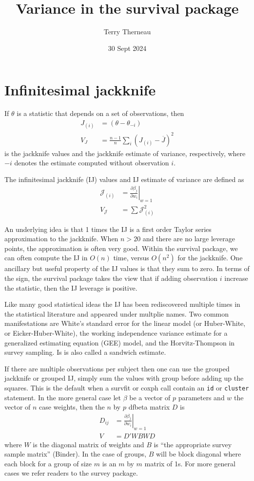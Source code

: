 \documentclass{article}\usepackage[]{graphicx}\usepackage[]{xcolor}
\title{Variance in the survival package}
\author{Terry Therneau}
\date{30 Sept 2024}
\newcommand{\code}[1]{\texttt{#1}}
\begin{document}
\maketitle



\section{Infinitesimal jackknife}
If $\theta$ is a statistic that depends on a set of observations, then
\begin{align*}
  J_{(i)} &= (\theta - \theta_{-i}) \\
  V_J &= \frac{n-1}{n} \sum_i (J_{(i)} - \overline J)^2
\end{align*}
is the jackknife values and the jackknife estimate of variance,
respectively, where $-i$ denotes the estimate computed without observation
$i$.

The infinitesimal jackknife (IJ) values and IJ estimate of variance 
are defined as 
\begin{align*}
 \mathcal{J}_{(i)} &=  \left.\frac{\partial \beta_j}{\partial w_i}\right|_{w=1} \\
 V_{\mathcal{J}} &=   \sum \mathcal{J}^2_{(i)}
\end{align*}
 
An underlying idea is that 1 times the IJ is a first order Taylor series
approximation to the jackknife.  When $n>20$ and there are no large leverage
points, the approximation is often very good. 
Within the survival package, we can often compute the IJ in $O(n)$ time, versus
$O(n^2)$ for the jackknife.
One ancillary but useful property of the IJ values is that they sum to zero.
In terms of the sign, the survival package takes the view that if adding
observation $i$ increase the statistic, then the IJ leverage is positive.

Like many good statistical ideas the IJ has been rediscovered multiple times
in the statistical literature and appeared under multplie names.
Two common manifestations are White's standard
error for the linear model (or Huber-White, or Eicker-Huber-White), the
working independence variance estimate for a generalized estimating equation
(GEE) model, and the Horvitz-Thompson in survey sampling.
  Is is also called a sandwich estimate.

If there are multiple observations per subject then one can use the grouped
jackknife or grouped IJ, simply sum the values with group before adding
up the squares.  This is the default when a survfit or coxph call contain
an \code{id} or \code{cluster} statement.
In the more general case
let $\beta$ be a vector of $p$ parameters and $w$ the vector of $n$ case
weights, then the $n$ by $p$ dfbeta matrix $D$ is
\begin{align}
  D_{ij} &= \left.\frac{\partial \beta_j}{\partial w_i}\right|_{w=1} \\
  V &= D'WBW D  \label{ijvar}
\end{align}
where $W$ is the diagonal matrix of weights and
$B$ is ``the appropriate survey sample matrix'' (Binder).
In the case of groups, $B$ will be block diagonal where each block for a
group of size $m$ is an $m$ by $m$ matrix of 1s.  
For more general cases we refer readers to the survey package.
\end{document}
